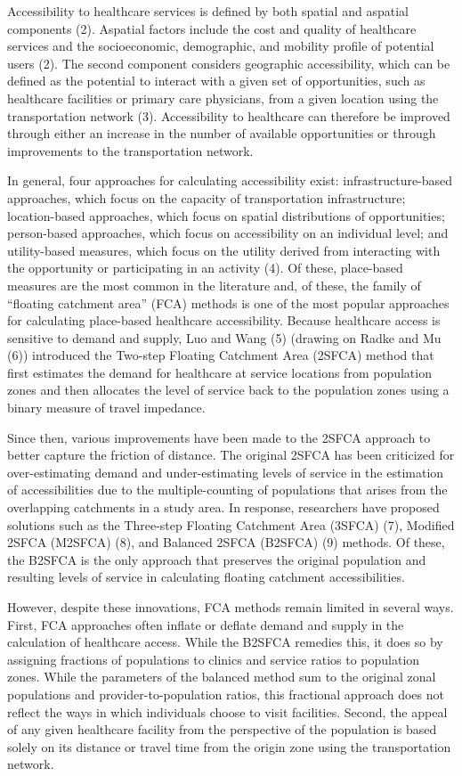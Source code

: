 \documentclass{article}
\begin{document}
Accessibility to healthcare services is defined by both spatial and
aspatial components (2). Aspatial factors include the cost and quality
of healthcare services and the socioeconomic, demographic, and mobility
profile of potential users (2). The second component considers
geographic accessibility, which can be defined as the potential to
interact with a given set of opportunities, such as healthcare
facilities or primary care physicians, from a given location using the
transportation network (3). Accessibility to healthcare can therefore be
improved through either an increase in the number of available
opportunities or through improvements to the transportation network.

In general, four approaches for calculating accessibility exist:
infrastructure-based approaches, which focus on the capacity of
transportation infrastructure; location-based approaches, which focus on
spatial distributions of opportunities; person-based approaches, which
focus on accessibility on an individual level; and utility-based
measures, which focus on the utility derived from interacting with the
opportunity or participating in an activity (4). Of these, place-based
measures are the most common in the literature and, of these, the family
of ``floating catchment area'' (FCA) methods is one of the most popular
approaches for calculating place-based healthcare accessibility. Because
healthcare access is sensitive to demand and supply, Luo and Wang (5)
(drawing on Radke and Mu (6)) introduced the Two-step Floating Catchment
Area (2SFCA) method that first estimates the demand for healthcare at
service locations from population zones and then allocates the level of
service back to the population zones using a binary measure of travel
impedance.

Since then, various improvements have been made to the 2SFCA approach to
better capture the friction of distance. The original 2SFCA has been
criticized for over-estimating demand and under-estimating levels of
service in the estimation of accessibilities due to the
multiple-counting of populations that arises from the overlapping
catchments in a study area. In response, researchers have proposed
solutions such as the Three-step Floating Catchment Area (3SFCA) (7),
Modified 2SFCA (M2SFCA) (8), and Balanced 2SFCA (B2SFCA) (9) methods. Of
these, the B2SFCA is the only approach that preserves the original
population and resulting levels of service in calculating floating
catchment accessibilities.

However, despite these innovations, FCA methods remain limited in
several ways. First, FCA approaches often inflate or deflate demand and
supply in the calculation of healthcare access. While the B2SFCA
remedies this, it does so by assigning fractions of populations to
clinics and service ratios to population zones. While the parameters of
the balanced method sum to the original zonal populations and
provider-to-population ratios, this fractional approach does not reflect
the ways in which individuals choose to visit facilities. Second, the
appeal of any given healthcare facility from the perspective of the
population is based solely on its distance or travel time from the
origin zone using the transportation network.
\end{document}
